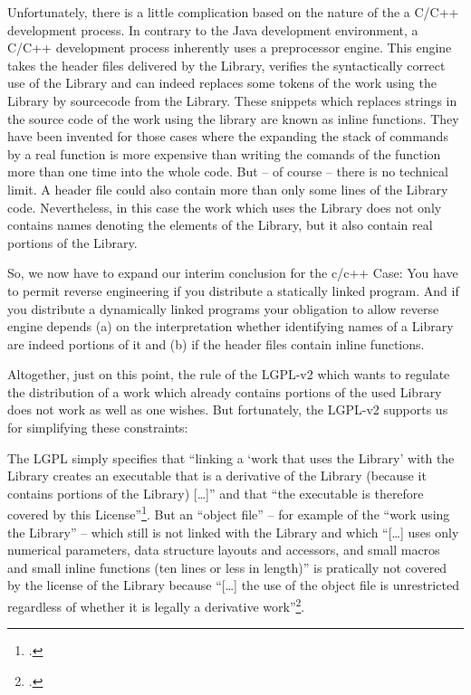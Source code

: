 Unfortunately, there is a little complication based on the nature of the a C/C++
development process. In contrary to the Java development environment, a C/C++
development process inherently uses a preprocessor engine. This engine takes the
header files delivered by the Library, verifies the syntactically correct use of
the Library and can indeed replaces some tokens of the work using the Library by
sourcecode from the Library. These snippets which replaces strings in the source
code of the work using the library are known as inline functions. They have been
invented for those cases where the expanding the stack of commands by a real
function is more expensive than writing the comands of the function more than
one time into the whole code. But -- of course -- there is no technical limit. A
header file could also contain more than only some lines of the Library code.
Nevertheless, in this case the work which uses the Library does not only
contains names denoting the elements of the Library, but it also contain real
portions of the Library. 

So, we now have to expand our interim conclusion for the c/c++ Case: You have to
permit reverse engineering if you distribute a statically linked program. And 
if you distribute a dynamically linked programs your obligation to allow reverse
engine depends (a) on the interpretation whether identifying names of a Library
are indeed portions of it and (b) if the header files contain inline functions.

Altogether, just on this point, the rule of the LGPL-v2 which wants to regulate
the distribution of a work which already contains portions of the used Library
does not work as well as one wishes. But fortunately, the LGPL-v2 supports us
for simplifying these constraints:

The LGPL simply specifies that \enquote{linking a \enquote{work that uses the
Library} with the Library creates an executable that is a derivative of the
Library (because it contains portions of the Library) [\ldots]} and that
\enquote{the executable is therefore covered by this
License}\footcite[cf.][\nopage wp. §5]{Lgpl21OsiLicense199a}. But an
\enquote{object file} -- for example of the \enquote{work using the Library} --
which still is not linked with the Library and which \enquote{[\ldots] uses only
numerical parameters, data structure layouts and accessors, and small macros and
small inline functions (ten lines or less in length)} is pratically not covered
by the license of the Library because \enquote{[\ldots] the use of the object
file is unrestricted regardless of whether it is legally a derivative
work}\footcite[cf.][\nopage wp. §5]{Lgpl21OsiLicense199a}.

